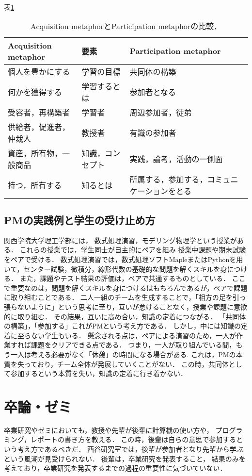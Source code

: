 \documentclass[a4,p11]{article}
\begin{document}
表\ref{tab:org6fcabb1}

\begin{table}[bt]
\caption{\label{tab:org6fcabb1}
Acquisition metaphorとParticipation metaphorの比較．}
\centering
\begin{tabular}{lll}
\hline
Acquisition metaphor & 要素 & Participation metaphor\\
\hline
個人を豊かにする & 学習の目標 & 共同体の構築\\
何かを獲得する & 学習するとは & 参加者となる\\
受容者，再構築者 & 学習者 & 周辺参加者，徒弟\\
供給者，促進者，仲裁人 & 教授者 & 有識の参加者\\
資産，所有物，一般商品 & 知識，コンセプト & 実践，論考，活動の一側面\\
持つ，所有する & 知るとは & 所属する，参加する，コミュニケーションをとる\\
\hline
\end{tabular}
\end{table}

\subsection{PMの実践例と学生の受け止め方}
\label{sec:orgb76ae26}
関西学院大学理工学部には，
数式処理演習，モデリング物理学という授業がある．
これらの授業では，学生同士が自主的にペアを組み
授業中課題や期末試験をペアで受ける．
数式処理演習では，数式処理ソフトMapleまたはPythonを用いて，センター試験，微積分，線形代数の基礎的な問題を解くスキルを身につける．
また，課題やテスト結果の評価は，ペアで共通するものとしている．
ここで重要なのは，問題を解くスキルを身につけるはもちろんであるが，ペアで課題に取り組むことである．
二人一組のチームを生成することで，「相方の足を引っ張らないように」という思考に至り，互いが怠けることなく，授業や課題に意欲的に取り組む．
その結果，互いに高め合い，知識の定着につながる．
「共同体の構築」，「参加する」これがPMという考え方である．
しかし，中には知識の定着に至らない学生もいる．
懸念される点は，ペアによる演習のため，一人が作業すれば課題をクリアできる点である．
つまり，一人が取り組んでいる間，もう一人は考える必要がなく「休憩」の時間になる場合がある.
これは，PMの本質を失っており，チーム全体が発展していくことがない．
この時，共同体として参加するという本質を失い，知識の定着に行き着かない．

\section{卒論・ゼミ}
\label{sec:orgf8d80c3}
卒業研究やゼミにおいても，教授や先輩が後輩に計算機の使い方や，
プログラミング，レポートの書き方を教える．
この時，後輩は自らの意思で参加するという考え方であるべきだ．
西谷研究室では，後輩が参加者となり先輩から学ぶという風潮が見受けられない．
後輩は，卒業研究を発表すること，
結果のみを考えており，卒業研究を発表するまでの過程の重要性に気づいていない．
\end{document}
